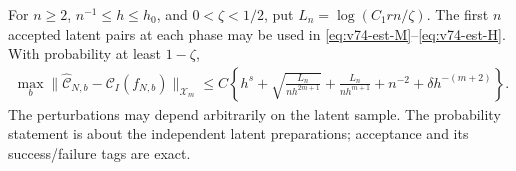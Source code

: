 \begin{lemma}
\label{lem:v74-estimation}
For $n\ge2$, $n^{-1}\le h\le h_0$, and $0<\zeta<1/2$, put
$L_n=\log(C_1rn/\zeta)$.  The first $n$ accepted latent pairs at
each phase may be used in \eqref{eq:v74-est-M}--\eqref{eq:v74-est-H}.
With probability at least $1-\zeta$,
\begin{equation}\label{eq:v74-kernel-bound}
 \begin{split}
 \max_b\|\widehat{\mathcal C}_{N,b}-
                 \mathcal C_I(f_{N,b})\|_{\mathcal X_m}
 \le C\left\{h^s+\sqrt{\frac{L_n}{nh^{2m+1}}}
       +\frac{L_n}{nh^{m+1}}+n^{-2}
       +\delta h^{-(m+2)}\right\}.
 \end{split}
\end{equation}
The perturbations may depend arbitrarily on the latent sample.  The
probability statement is about the independent latent preparations;
acceptance and its success/failure tags are exact.
\end{lemma}
